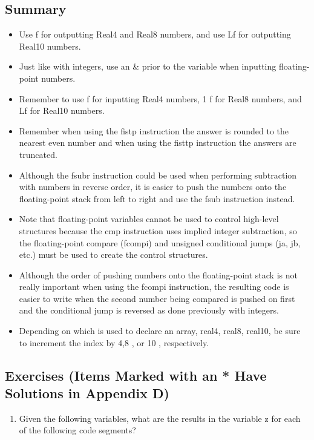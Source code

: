 \documentclass[10pt]{article}
\begin{document}
\subsection*{Summary}
\begin{itemize}
  \item Use f for outputting Real4 and Real8 numbers, and use Lf for outputting Real10 numbers.
  \item Just like with integers, use an \& prior to the variable when inputting floating-point numbers.
  \item Remember to use f for inputting Real4 numbers, 1 f for Real8 numbers, and Lf for Real10 numbers.
  \item Remember when using the fistp instruction the answer is rounded to the nearest even number and when using the fisttp instruction the answers are truncated.
  \item Although the fsubr instruction could be used when performing subtraction with numbers in reverse order, it is easier to push the numbers onto the floating-point stack from left to right and use the fsub instruction instead.
  \item Note that floating-point variables cannot be used to control high-level structures because the cmp instruction uses implied integer subtraction, so the floating-point compare (fcompi) and unsigned conditional jumps (ja, jb, etc.) must be used to create the control structures.
  \item Although the order of pushing numbers onto the floating-point stack is not really important when using the fcompi instruction, the resulting code is easier to write when the second number being compared is pushed on first and the conditional jump is reversed as done previously with integers.
  \item Depending on which is used to declare an array, real4, real8, real10, be sure to increment the index by 4,8 , or 10 , respectively.
\end{itemize}

\subsection*{Exercises (Items Marked with an * Have Solutions in Appendix D)}
\begin{enumerate}
  \item Given the following variables, what are the results in the variable z for each of the following code segments?
\end{enumerate}
\end{document}
